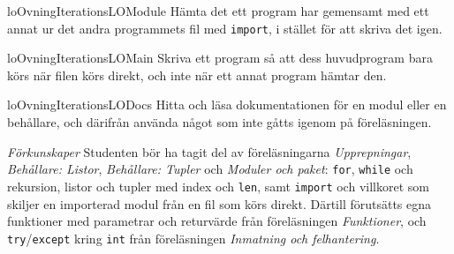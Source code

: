 \begin{restatable}{lo}{OvningIterationsLOModule}%
  \label{OvningIterationsLOModule}%
  Hämta det ett program har gemensamt med ett annat ur det andra
  programmets fil med \texttt{import}, i stället för att
  skriva det igen. %
\end{restatable}
\begin{restatable}{lo}{OvningIterationsLOMain}%
  \label{OvningIterationsLOMain}%
  Skriva ett program så att dess huvudprogram bara körs när filen körs
  direkt, och inte när ett annat program hämtar den. %
\end{restatable}
\begin{restatable}{lo}{OvningIterationsLODocs}%
  \label{OvningIterationsLODocs}%
  Hitta och läsa dokumentationen för en modul eller en behållare, och
  därifrån använda något som inte gåtts igenom på
  föreläsningen. %
\end{restatable}

\emph{Förkunskaper}
Studenten bör ha tagit del av föreläsningarna \emph{Upprepningar},
\emph{Behållare: Listor}, \emph{Behållare: Tupler} och \emph{Moduler och
paket}: \texttt{for}, \texttt{while} och
rekursion, listor och tupler med index och \texttt{len}, samt
\texttt{import} och villkoret som skiljer en importerad modul
från en fil som körs direkt.  Därtill förutsätts egna funktioner med
parametrar och returvärde från föreläsningen \emph{Funktioner}, och
\texttt{try}/\texttt{except} kring
\texttt{int} från föreläsningen \emph{Inmatning och
felhantering}.

